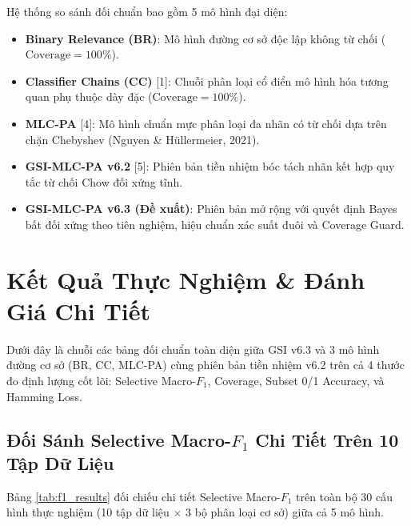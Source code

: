 \documentclass[10pt,a4paper,twoside]{article}
\begin{document}
Hệ thống so sánh đối chuẩn bao gồm 5 mô hình đại diện:
\begin{itemize}[leftmargin=*]
    \item \textbf{Binary Relevance (BR)}: Mô hình đường cơ sở độc lập không từ chối ($\text{Coverage} = 100\%$).
    \item \textbf{Classifier Chains (CC)} [1]: Chuỗi phân loại cổ điển mô hình hóa tương quan phụ thuộc dày đặc ($\text{Coverage} = 100\%$).
    \item \textbf{MLC-PA} [4]: Mô hình chuẩn mực phân loại đa nhãn có từ chối dựa trên chặn Chebyshev (Nguyen \& H{\"u}llermeier, 2021).
    \item \textbf{GSI-MLC-PA v6.2} [5]: Phiên bản tiền nhiệm bóc tách nhãn kết hợp quy tắc từ chối Chow đối xứng tĩnh.
    \item \textbf{GSI-MLC-PA v6.3 (Đề xuất)}: Phiên bản mở rộng với quyết định Bayes bất đối xứng theo tiên nghiệm, hiệu chuẩn xác suất đuôi và Coverage Guard.
\end{itemize}

\clearpage
\section{Kết Quả Thực Nghiệm \& Đánh Giá Chi Tiết}
Dưới đây là chuỗi các bảng đối chuẩn toàn diện giữa GSI v6.3 và 3 mô hình đường cơ sở (BR, CC, MLC-PA) cùng phiên bản tiền nhiệm v6.2 trên cả 4 thước đo định lượng cốt lõi: Selective Macro-$F_1$, Coverage, Subset 0/1 Accuracy, và Hamming Loss.

\subsection{Đối Sánh Selective Macro-$F_1$ Chi Tiết Trên 10 Tập Dữ Liệu}
Bảng \ref{tab:f1_results} đối chiếu chi tiết Selective Macro-$F_1$ trên toàn bộ 30 cấu hình thực nghiệm (10 tập dữ liệu $\times$ 3 bộ phân loại cơ sở) giữa cả 5 mô hình.
\end{document}
